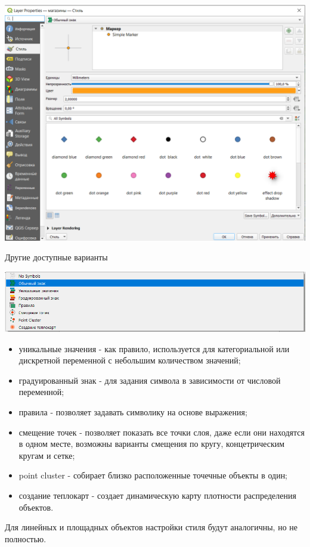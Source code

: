 \documentclass[
]{book}
\begin{document}
\includegraphics{figures/8.PNG}

Другие доступные варианты

\includegraphics{figures/9.png}

\begin{itemize}
\item
  уникальные значения - как правило, используется для категориальной или дискретной переменной с небольшим количеством значений;
\item
  градуированный знак - для задания символа в зависимости от числовой переменной;
\item
  правила - позволяет задавать символику на основе выражения;
\item
  смещение точек - позволяет показать все точки слоя, даже если они находятся в одном месте, возможны варианты смещения по кругу, концетрическим кругам и сетке;
\item
  point cluster - собирает близко расположенные точечные объекты в один;
\item
  создание теплокарт - создает динамическую карту плотности распределения объектов.
\end{itemize}

Для линейных и площадных объектов настройки стиля будут аналогичны, но не полностью.
\end{document}
